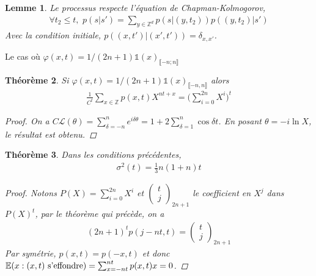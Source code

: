 \documentclass{article}
\newtheorem{theorem}{Théorème}[section]
\newtheorem{lemma}[theorem]{Lemme}
\theoremstyle{definition}
\begin{document}
\begin{lemma}
	Le processus respecte l'équation de Chapman-Kolmogorov, 
\begin{align*}
\forall t_2\leq t, \,\,p(s|s') = \sum_{y\in\mathbb{Z}^d}p(s|(y,t_2))p((y,t_2)|s')\end{align*}
Avec la condition initiale, $p((x,t')|(x',t')) = \delta_{x, x'}$.
\end{lemma}

\begin{section}{Le cas où $\varphi(x, t) = 1/(2n+1)\mathds{1}(x)_{\llbracket -n; n\rrbracket}$}
\begin{theorem}
	Si $\varphi(x, t) =1/(2n+1)\mathds{1}(x)_{\llbracket -n,n\rrbracket}$ alors 
	\begin{align*}
	  \frac{1}{C^t} \sum_{x\in\mathbb{Z}}p(x,t) X^{nt+x} = \bigg(\sum_{i=0}^{2n} X^i\bigg)^t\end{align*}
	  \begin{proof}
		  On a $C\mathcal{L}(\theta) = \sum_{\delta=-n}^{n} e^{i\delta \theta} = 1 + 2\sum_{\delta=1}^n \cos \delta t$. En posant $\theta = -i \ln X$, le résultat est obtenu.

	  \end{proof}
\end{theorem}
\begin{theorem}
	Dans les conditions précédentes,  
	\begin{align*}
		\sigma^2(t) = \frac{1}{3} n (1+n) t
	\end{align*}
	\begin{proof}
		Notons $P(X) = \sum_{i=0}^{2n} X^i$ et $\begin{pmatrix}t\\j\end{pmatrix}_{2n+1}$ le coefficient en $X^j$ dans $P(X)^t$, par le théorème qui précède, on a
		\begin{align*}
			(2n+1)^t p(j-nt,t) = \begin{pmatrix} t\\j \end{pmatrix}_{2n+1}
		\end{align*}
		Par symétrie, $p(x,t) = p(-x,t)$ et donc $\mathbb{E}(x : (x,t) \textup{ s'effondre}) = \sum_{x=-n t}^{n t} p(x,t) x = 0$.


\end{proof}
\end{theorem}
\end{section}
\end{document}
